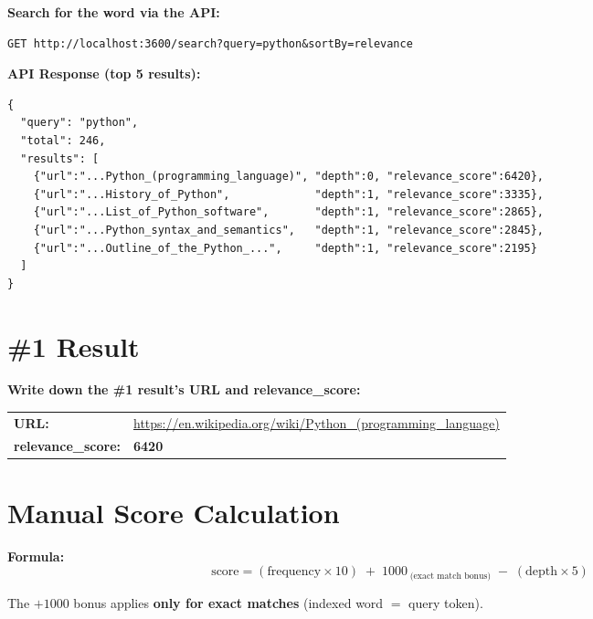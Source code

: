 \documentclass[12pt,a4paper]{article}
\newenvironment{answerbox}{%
  \begin{mdframed}[
    backgroundcolor=lightaccent,
    linecolor=accent,
    linewidth=1pt,
    innerleftmargin=10pt,
    innerrightmargin=10pt,
    innertopmargin=8pt,
    innerbottommargin=8pt,
  ]%
}{\end{mdframed}}
\begin{document}
\textbf{Search for the word via the API:}
\begin{lstlisting}[style=inline]
GET http://localhost:3600/search?query=python&sortBy=relevance
\end{lstlisting}

\begin{answerbox}
\textbf{API Response (top 5 results):}
\begin{lstlisting}[style=inline]
{
  "query": "python",
  "total": 246,
  "results": [
    {"url":"...Python_(programming_language)", "depth":0, "relevance_score":6420},
    {"url":"...History_of_Python",             "depth":1, "relevance_score":3335},
    {"url":"...List_of_Python_software",       "depth":1, "relevance_score":2865},
    {"url":"...Python_syntax_and_semantics",   "depth":1, "relevance_score":2845},
    {"url":"...Outline_of_the_Python_...",     "depth":1, "relevance_score":2195}
  ]
}
\end{lstlisting}
\end{answerbox}

\section{\#1 Result}

\textbf{Write down the \#1 result's URL and relevance\_score:}

\begin{answerbox}
\begin{tabular}{@{} l p{10cm}}
  \textbf{URL:} &
  \url{https://en.wikipedia.org/wiki/Python_(programming_language)} \\[4pt]
  \textbf{relevance\_score:} & \textbf{6420} \\
\end{tabular}
\end{answerbox}

\section{Manual Score Calculation}

\textbf{Formula:}
\[
  \text{score} = (\text{frequency} \times 10) \;+\; 1000_{\;\text{(exact match bonus)}} \;-\; (\text{depth} \times 5)
\]

The $+1000$ bonus applies \textbf{only for exact matches} (indexed word $=$ query token).
\end{document}
